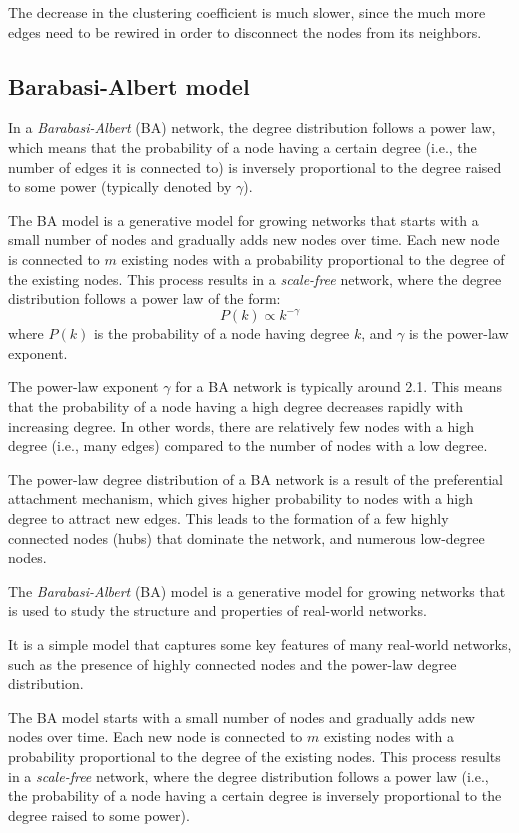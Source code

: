 The decrease in the clustering coefficient is much slower, since the
much more edges need to be rewired in order to disconnect the nodes from
its neighbors.


\subsection{Barabasi-Albert model}

In a \emph{Barabasi-Albert} (BA) network, the degree distribution follows a power law,
which means that the probability of a node having a certain degree
 (i.e., the number of edges it is connected to) is inversely proportional
 to the degree raised to some power (typically denoted by $\gamma$).

The BA model is a generative model for growing networks that starts with
a small number of nodes and gradually adds new nodes over time.
Each new node is connected to $m$ existing nodes with a probability proportional to the degree of
the existing nodes. This process results in a \emph{scale-free} network,
where the degree distribution follows a power law of the form:
\begin{equation*}
    P(k) \propto k^{-\gamma}
\end{equation*}
where $P(k)$ is the probability of a node having degree $k$, and $\gamma$ is the power-law exponent.

The power-law exponent $\gamma$ for a BA network is typically around 2.1.
This means that the probability of a node having a high degree decreases rapidly with increasing
degree.
In other words, there are relatively few nodes with a high degree (i.e., many edges) compared to
the number of nodes with a low degree.

The power-law degree distribution of a BA network is a result of the preferential attachment mechanism,
which gives higher probability to nodes with a high degree
to attract new edges. This leads to the formation of a few highly connected nodes (hubs)
that dominate the network, and numerous low-degree nodes.

The \emph{Barabasi-Albert} (BA) model is a generative model for growing networks that is used
to study the structure and properties of real-world networks.

It is a simple model that captures some key features of many real-world networks,
such as the presence of highly connected nodes and the power-law degree distribution.

The BA model starts with a small number of nodes and
gradually adds new nodes over time. Each new node is connected to $m$ existing nodes with
a probability proportional to the degree of the existing nodes. This process results in a \emph{scale-free} network,
where the degree distribution follows a power law
(i.e., the probability of a node having a certain degree is inversely proportional to the degree raised to some power).


